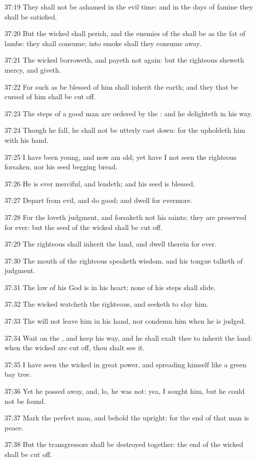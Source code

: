 37:19 They shall not be ashamed in the evil time: and in the days of famine they shall be satisfied.

37:20 But the wicked shall perish, and the enemies of the \LORD shall be as the fat of lambs: they shall consume; into smoke shall they consume away.

37:21 The wicked borroweth, and payeth not again: but the righteous sheweth mercy, and giveth.

37:22 For such as be blessed of him shall inherit the earth; and they that be cursed of him shall be cut off.

37:23 The steps of a good man are ordered by the \LORD: and he delighteth in his way.

37:24 Though he fall, he shall not be utterly cast down: for the \LORD upholdeth him with his hand.

37:25 I have been young, and now am old; yet have I not seen the righteous forsaken, nor his seed begging bread.

37:26 He is ever merciful, and lendeth; and his seed is blessed.

37:27 Depart from evil, and do good; and dwell for evermore.

37:28 For the \LORD loveth judgment, and forsaketh not his saints; they are preserved for ever: but the seed of the wicked shall be cut off.

37:29 The righteous shall inherit the land, and dwell therein for ever.

37:30 The mouth of the righteous speaketh wisdom, and his tongue talketh of judgment.

37:31 The law of his God is in his heart; none of his steps shall slide.

37:32 The wicked watcheth the righteous, and seeketh to slay him.

37:33 The \LORD will not leave him in his hand, nor condemn him when he is judged.

37:34 Wait on the \LORD, and keep his way, and he shall exalt thee to inherit the land: when the wicked are cut off, thou shalt see it.

37:35 I have seen the wicked in great power, and spreading himself like a green bay tree.

37:36 Yet he passed away, and, lo, he was not: yea, I sought him, but he could not be found.

37:37 Mark the perfect man, and behold the upright: for the end of that man is peace.

37:38 But the transgressors shall be destroyed together: the end of the wicked shall be cut off.

